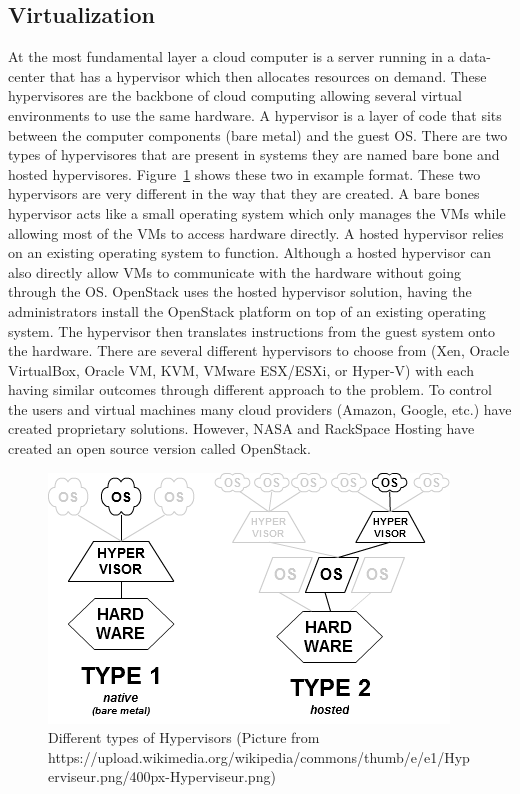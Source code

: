\documentclass[12pt]{article}
\begin{document}
\subsection{Virtualization}
At the most fundamental layer a cloud computer is a server running in a data-center that has a hypervisor which then allocates resources on demand. These hypervisores are the backbone of cloud computing allowing several virtual environments to use the same hardware. A hypervisor is a layer of code that sits between the computer components (bare metal) and the guest OS\@. There are two types of hypervisores that are present in systems they are named bare bone and hosted hypervisores. Figure~\ref{fig:Hypervisors} shows these two in example format. These two hypervisors are very different in the way that they are created.  A bare bones hypervisor acts like a small operating system which only manages the VMs while allowing most of the VMs to access hardware directly. A hosted hypervisor relies on an existing operating system to function. Although a hosted hypervisor can also directly allow VMs to communicate with the hardware without going through the OS\@. OpenStack uses the hosted hypervisor solution, having the administrators install the OpenStack platform on top of an existing operating system. The hypervisor then translates instructions from the guest system onto the hardware. There are several different hypervisors to choose from (Xen, Oracle VirtualBox, Oracle VM, KVM, VMware ESX/ESXi, or Hyper-V) with each having similar outcomes through different approach to the problem. To control the users and virtual machines many cloud providers (Amazon, Google, etc.) have created proprietary solutions. However, NASA and RackSpace Hosting \cite{OpenStack_Hist} have created an open source version called OpenStack.

\begin{figure}[H]
    \centering
    \includegraphics[scale=.8]{./pic/Hyperviseur.png}
    \caption{Different types of Hypervisors (Picture from https://upload.wikimedia.org/wikipedia/commons/thumb/e/e1/Hyperviseur.png/400px-Hyperviseur.png)}
    \label{fig:Hypervisors}
\end{figure}
\end{document}
